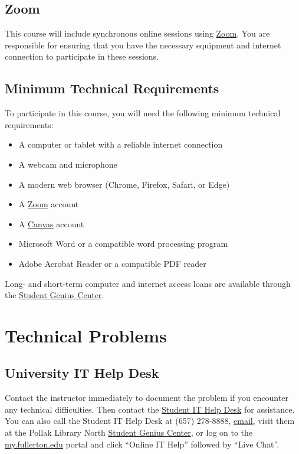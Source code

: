 \documentclass[12pt, letterpaper]{article}
\begin{document}
\subsection*{Zoom}
This course will include synchronous online sessions using \href{https://fullerton.zoom.us/}{Zoom}. You are responsible for ensuring that you have the necessary equipment and internet connection to participate in these sessions. 

\subsection*{Minimum Technical Requirements}

To participate in this course, you will need the following minimum technical requirements:
\begin{itemize}
    \item A computer or tablet with a reliable internet connection
    \item A webcam and microphone
    \item A modern web browser (Chrome, Firefox, Safari, or Edge)
    \item A \href{https://zoom.us/download}{Zoom} account
    \item A \href{https://csufullerton.instructure.com/}{Canvas} account
    \item Microsoft Word or a compatible word processing program
    \item Adobe Acrobat Reader or a compatible PDF reader
\end{itemize}

Long- and short-term computer and internet access loans are available through the \href{http://www.fullerton.edu/it/students/sgc/index.php}{Student Genius Center}.

\section{Technical Problems}

\subsection*{University IT Help Desk}

Contact the instructor immediately to document the problem if you encounter any technical difficulties. Then contact the \href{http://www.fullerton.edu/it/students/helpdesk/index.php}{Student IT Help Desk} for assistance. You can also call the Student IT Help Desk at (657) 278-8888, \href{mailto:StudentITHelpDesk@fullerton.edu}{email}, visit them at the Pollak Library North \href{http://www.fullerton.edu/it/students/sgc/index.php}{Student Genius Center}, or log on to the \href{http://my.fullerton.edu/}{my.fullerton.edu} portal and click ``Online IT Help'' followed by ``Live Chat''.
\end{document}
